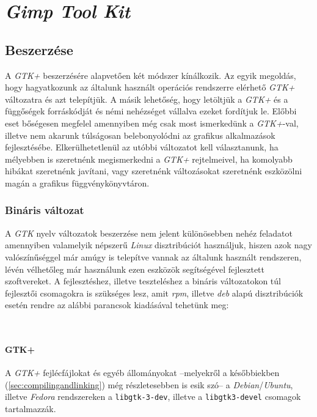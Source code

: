 \section{\textit{Gimp Tool Kit}}

\subsection{Beszerzése}

A \textit{GTK+} beszerzésére alapvetően két módszer kínálkozik. Az egyik megoldás, hogy hagyatkozunk az általunk használt operációs rendszerre elérhető \textit{GTK+} változatra és azt telepítjük. A másik lehetőség, hogy letöltjük a \textit{GTK+} és a függőségek forráskódját és némi nehézséget vállalva ezeket fordítjuk le. Előbbi eset bőségesen megfelel amennyiben még csak most ismerkedünk a \textit{GTK+}-val, illetve nem akarunk túlságosan belebonyolódni az grafikus alkalmazások fejlesztésébe. Elkerülhetetlenül az utóbbi változatot kell választanunk, ha mélyebben is szeretnénk megismerkedni a \textit{GTK+} rejtelmeivel, ha komolyabb hibákat szeretnénk javítani, vagy szeretnénk változásokat szeretnénk eszközölni magán a grafikus függvénykönyvtáron.

\subsubsection{Bináris változat}

A \textit{GTK} nyelv változatok beszerzése nem jelent különösebben nehéz feladatot amennyiben valamelyik népszerű \textit{Linux} disztribúciót használjuk, hiszen azok nagy valószínűséggel már amúgy is telepítve vannak az általunk használt rendszeren, lévén vélhetőleg már használunk ezen eszközök segítségével fejlesztett szoftvereket. A fejlesztéshez, illetve teszteléshez a bináris változatokon túl fejlesztői csomagokra is szükséges lesz, amit \textit{rpm}, illetve \textit{deb} alapú disztribúciók esetén rendre az alábbi parancsok kiadásával tehetünk meg:

\\

\paragraph{GTK+}

A \textit{GTK+} fejlécfájlokat és egyéb állományokat --melyekről a későbbiekben (\ref{sec:compilingandlinking}) még részletesebben is esik szó-- a \textit{Debian}/\textit{Ubuntu}, illetve \textit{Fedora} rendszereken a \texttt{libgtk-3-dev}, illetve a \texttt{libgtk3-devel} csomagok tartalmazzák.

